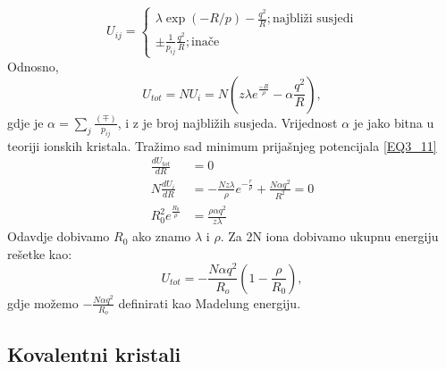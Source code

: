 \documentclass{article}
\numberwithin{equation}{section}
\begin{document}
\begin{equation}
U_{i j}=\left\{\begin{array}{l}
\lambda \exp (-R / p)-\frac{q^{2}}{R}; \text{najbliži susjedi} \\
\pm \frac{1}{p_{i j}} \frac{q^{2}}{R}; \text{inače}
\end{array}\right.
\label{EQ3_10}
\end{equation}
Odnosno,
\begin{equation}
    U_{tot}=NU_i=N\left(z\lambda e^{\frac{-R}{\rho}}-\alpha \frac{q^2}{R}\right),
    \label{EQ3_11}
\end{equation}
gdje je $\alpha=\sum_j \frac{(\mp)}{p_{ij}}$, i z je broj najbližih susjeda. Vrijednost $\alpha$ je jako bitna u teoriji ionskih kristala. Tražimo sad minimum prijašnjeg potencijala \ref{EQ3_11}
\begin{equation}
\begin{split}
    \frac{dU_{tot}}{dR}&=0\\
    N\frac{dU_i}{dR}&=-\frac{Nz\lambda}{\rho}e^{-\frac{r}{\rho}}+\frac{N\alpha q^2}{R^2}=0\\
    R^2_0 e^{\frac{R_0}{\rho}}&=\frac{\rho \alpha q^2}{z\lambda}
\end{split}
\label{EQ3_12}
\end{equation}
Odavdje dobivamo $R_0$ ako znamo $\lambda$ i $\rho$. Za 2N iona dobivamo ukupnu energiju rešetke kao:
\begin{equation}
    U_{tot}=-\frac{N\alpha q^2}{R_o}\left(1-\frac{\rho}{R_0}\right),
    \label{EQ3_13}
\end{equation}
gdje možemo $-\frac{N\alpha q^2}{R_o}$ definirati kao Madelung energiju.

\subsection{Kovalentni kristali}

\newpage
\end{document}
